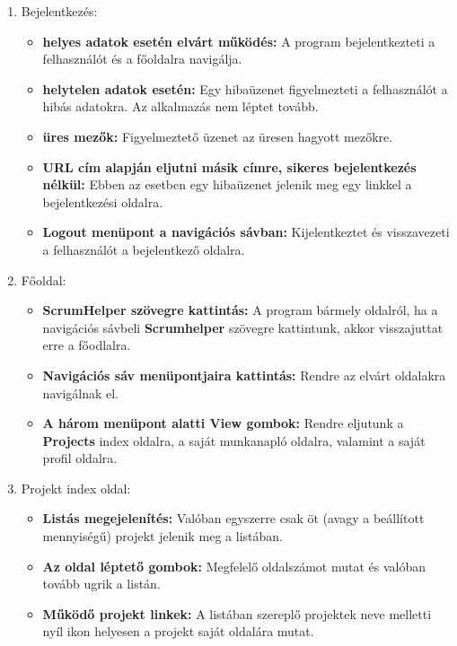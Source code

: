 \begin{enumerate}
	\item Bejelentkezés: 
	\begin{itemize}
		\item \textbf{helyes adatok esetén elvárt működés:} A program bejelentkezteti a felhasználót és a főoldalra navigálja.
		\item \textbf{helytelen adatok esetén:} Egy hibaüzenet figyelmezteti a felhasználót a hibás adatokra. Az alkalmazás nem léptet tovább.
		\item \textbf{üres mezők:} Figyelmeztető üzenet az üresen hagyott mezőkre.
		\item \textbf{URL cím alapján eljutni másik címre, sikeres bejelentkezés nélkül:} Ebben az esetben egy hibaüzenet jelenik meg egy linkkel a bejelentkezési oldalra.
		\item \textbf{Logout menüpont a navigációs sávban:} Kijelentkeztet és visszavezeti a felhasználót a bejelentkező oldalra.
	\end{itemize}
	\item Főoldal:
	\begin{itemize}
		\item \textbf{ScrumHelper szövegre kattintás:} A program bármely oldalról, ha a navigációs sávbeli \textbf{Scrumhelper} szövegre kattintunk, akkor visszajuttat erre a főodlalra.
		\item \textbf{Navigációs sáv menüpontjaira kattintás:} Rendre az elvárt oldalakra navigálnak el.
		\item \textbf{A három menüpont alatti View gombok:} Rendre eljutunk a \textbf{Projects} index oldalra, a saját munkanapló oldalra, valamint a saját profil oldalra.
	\end{itemize}
	\item Projekt index oldal:
	\begin{itemize}
		\item \textbf{Listás megejelenítés:} Valóban egyszerre csak öt (avagy a beállított mennyiségű) projekt jelenik meg a listában.
		\item \textbf{Az oldal léptető gombok:} Megfelelő oldalszámot mutat és valóban tovább ugrik a listán.
		\item \textbf{Működő projekt linkek:} A listában szereplő projektek neve melletti nyíl ikon helyesen a projekt saját oldalára mutat.
	\end{itemize} 
\end{enumerate}